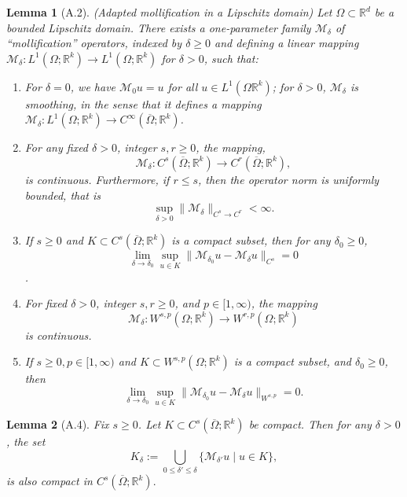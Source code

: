 \documentclass[reqno]{amsart}
\theoremstyle{plain}
\newtheorem{lem}{Lemma}
\theoremstyle{definition}
\newcommand{\bb}[1]{\mathbb{#1}}
\newcommand{\cal}[1]{\mathcal{#1}}
\begin{document}
\begin{lem}[A.2](Adapted mollification in a Lipschitz domain) \label{A.2}
    Let $\Omega \subset \bb R^d$ be a bounded Lipschitz domain. There exists a one-parameter family $\cal M_\delta$ of ``mollification'' operators, indexed by $\delta \geq 0$ and defining a linear mapping $\cal M_\delta :L^1(\Omega;\bb R^k) \to L^1(\Omega; \bb R^k)$ for $\delta > 0$, such that:
    \begin{enumerate}
        \item For $\delta = 0$, we have $\cal M_0u = u$ for all $u \in L^1(\Omega \bb R^k)$; for $\delta > 0$, $\cal M_\delta$ is smoothing, in the sense that it defines a mapping $\cal M_\delta :L^1(\Omega;\bb R^k)\to C^\infty(\overline{\Omega};\bb R^k)$.
        \item For any fixed $\delta > 0$, integer $s,r \geq 0$, the mapping, $$ \cal M_\delta : C^s(\overline{\Omega};\bb R^k) \to C^r(\overline{\Omega};\bb R^k),$$ is continuous. Furthermore, if $r \leq s$, then the operator norm is uniformly bounded, that is $$\sup\limits_{\delta>0} \|\cal M_\delta\|_{C^s \to C^r} < \infty.$$
        \item If $s \geq 0$ and $K \subset C^s(\overline{\Omega};\bb R^k)$ is a compact subset, then for any $\delta_0 \geq 0$, $$ \lim_{\delta \to \delta_0} \sup_{u \in K} \|\cal M_{\delta_0} u - \cal M_\delta u\|_{C^s} = 0$$.
        \item For fixed $\delta > 0$, integer $s,r \geq 0$, and $p \in [1,\infty)$, the mapping $$\cal M_\delta : W^{s,p}(\Omega;\bb R^k) \to W^{r,p}(\Omega;\bb R^k)$$ is continuous.
        \item If $s \geq 0, p \in [1, \infty)$ and $K \subset W^{s,p}(\Omega;\bb R^k)$ is a compact subset, and $\delta_0 \geq 0$, then $$ \lim_{\delta \to \delta_0}\sup_{u \in K}\|\cal M_{\delta_0}u - \cal M_\delta u\|_{W^{s,p}} = 0.$$
    \end{enumerate}
\end{lem}
\begin{lem}[A.4]
    Fix $s \geq 0$. Let $K \subset C^s(\overline{\Omega};\bb R^k)$ be compact. Then for any $\delta > 0$, the set 
    $$ K_\delta := \bigcup\limits_{0\leq \delta' \leq \delta} \{\cal M_{\delta'}u \mid u\in K\},$$
    is also compact in $C^s(\overline{\Omega};\bb R^k).$
\end{lem}
\end{document}
